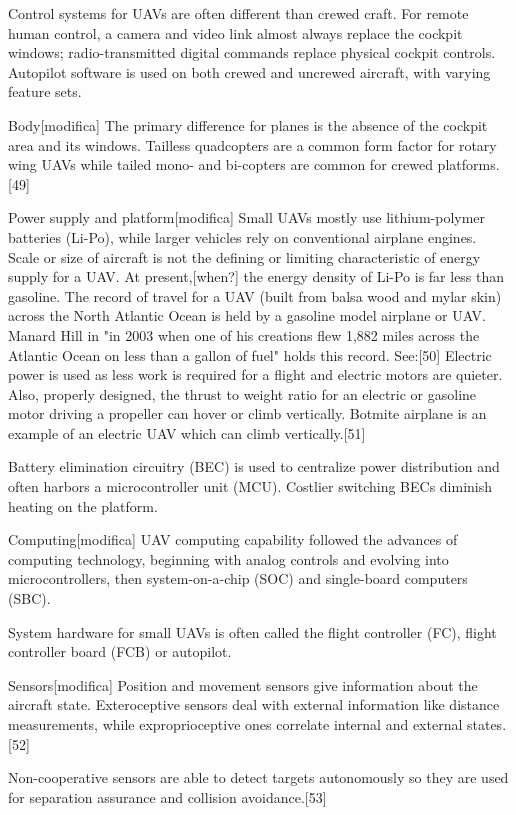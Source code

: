Control systems for UAVs are often different than crewed craft. For remote human control, a camera and video link almost always replace the cockpit windows; radio-transmitted digital commands replace physical cockpit controls. Autopilot software is used on both crewed and uncrewed aircraft, with varying feature sets.


Body[modifica]
The primary difference for planes is the absence of the cockpit area and its windows. Tailless quadcopters are a common form factor for rotary wing UAVs while tailed mono- and bi-copters are common for crewed platforms.[49]

Power supply and platform[modifica]
Small UAVs mostly use lithium-polymer batteries (Li-Po), while larger vehicles rely on conventional airplane engines. Scale or size of aircraft is not the defining or limiting characteristic of energy supply for a UAV. At present,[when?] the energy density of Li-Po is far less than gasoline. The record of travel for a UAV (built from balsa wood and mylar skin) across the North Atlantic Ocean is held by a gasoline model airplane or UAV. Manard Hill in "in 2003 when one of his creations flew 1,882 miles across the Atlantic Ocean on less than a gallon of fuel" holds this record. See:[50] Electric power is used as less work is required for a flight and electric motors are quieter. Also, properly designed, the thrust to weight ratio for an electric or gasoline motor driving a propeller can hover or climb vertically. Botmite airplane is an example of an electric UAV which can climb vertically.[51]

Battery elimination circuitry (BEC) is used to centralize power distribution and often harbors a microcontroller unit (MCU). Costlier switching BECs diminish heating on the platform.

Computing[modifica]
UAV computing capability followed the advances of computing technology, beginning with analog controls and evolving into microcontrollers, then system-on-a-chip (SOC) and single-board computers (SBC).

System hardware for small UAVs is often called the flight controller (FC), flight controller board (FCB) or autopilot.

Sensors[modifica]
Position and movement sensors give information about the aircraft state. Exteroceptive sensors deal with external information like distance measurements, while exproprioceptive ones correlate internal and external states.[52]

Non-cooperative sensors are able to detect targets autonomously so they are used for separation assurance and collision avoidance.[53]

